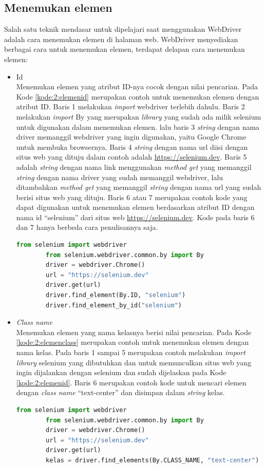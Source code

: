 \subsection{Menemukan elemen}
Salah satu teknik mendasar untuk dipelajari saat menggunakan WebDriver adalah cara menemukan elemen di halaman web. WebDriver menyediakan berbagai cara untuk menemukan elemen, terdapat delapan cara menemukan elemen:
\begin{itemize}
	\item Id \\
	Menemukan elemen yang atribut ID-nya cocok dengan nilai pencarian. Pada Kode \ref{kode:2:elemenid} merupakan contoh untuk menemukan elemen dengan atribut ID. Baris 1 melakukan \textit{import} webdriver terlebih dahulu. Baris 2 melakukan \textit{import} By yang merupakan \textit{library} yang sudah ada milik selenium untuk digunakan dalam menemukan elemen. lalu baris 3 \textit{string} dengan nama driver memanggil webdriver yang ingin digunakan, yaitu Google Chrome untuk membuka browsernya. Baris 4 \textit{string} dengan nama url diisi dengan situs web yang dituju dalam contoh adalah \url{https://selenium.dev}. Baris 5 adalah \textit{string} dengan nama link menggunakan \textit{method get} yang memanggil \textit{string} dengan nama driver yang sudah memanggil webdriver, lalu ditambahkan \textit{method get} yang memanggil \textit{string} dengan nama url yang sudah berisi situs web yang dituju. Baris 6 atau 7 merupakan contoh kode yang dapat digunakan untuk menemukan elemen berdasarkan atribut ID dengan nama id ``selenium'' dari situs web \url{https://selenium.dev}. Kode pada baris 6 dan 7 hanya berbeda cara penulisannya saja. 
	\begin{lstlisting}[language=python, caption=Contoh kode untuk menemukan elemen dengan atribut ID, label=kode:2:elemenid]
		from selenium import webdriver
		from selenium.webdriver.common.by import By
		driver = webdriver.Chrome()
		url = "https://selenium.dev"
		driver.get(url)
		driver.find_element(By.ID, "selenium")	
		driver.find_element_by_id("selenium")
	\end{lstlisting}
	
	\item \textit{Class name}\\
	Menemukan elemen yang nama kelasnya berisi nilai pencarian. Pada Kode \ref{kode:2:elemenclass} merupakan contoh untuk menemukan elemen dengan nama kelas. Pada baris 1 sampai 5 merupakan contoh melakukan \textit{import library} selenium yang dibutuhkan dan untuk memunculkan situs web yang ingin dijalankan dengan selenium dan sudah dijelaskan pada Kode \ref{kode:2:elemenid}. Baris 6 merupakan contoh kode untuk mencari elemen dengan \textit{class name} ``text-center'' dan disimpan dalam \textit{string} kelas.
	\begin{lstlisting}[language=python, caption=Contoh kode untuk menemukan elemen dengan \textit{class name}, label=kode:2:elemenclass]
		from selenium import webdriver
		from selenium.webdriver.common.by import By
		driver = webdriver.Chrome()
		url = "https://selenium.dev"
		driver.get(url)
		kelas = driver.find_elements(By.CLASS_NAME, "text-center")
	\end{lstlisting}


\end{itemize}
